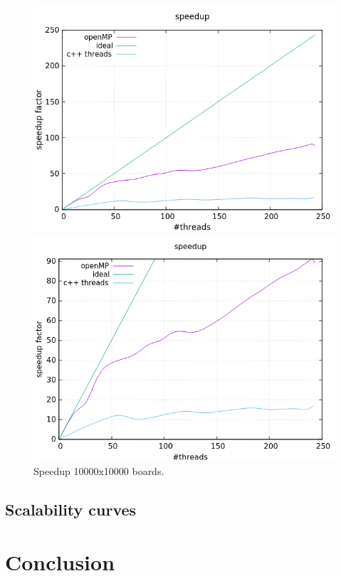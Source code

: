 \documentclass[a4paper,10pt]{article}
\begin{document}
\begin{figure}[H]
	\centering
	\begin{minipage}[t]{0.55\linewidth}
		\includegraphics[width=\linewidth]{10000_standard_speed.png}
	\end{minipage}%
	\begin{minipage}[t]{0.55\linewidth}
		\includegraphics[width=\linewidth]{10000_zoomed_speed.png}
	\end{minipage}
	\caption{Speedup 10000x10000 boards.}
	\label{10000}
\end{figure}

\subsection{Scalability curves}

\section{Conclusion}
\end{document}
